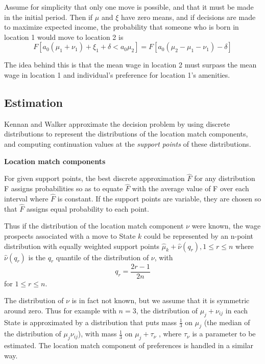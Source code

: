 \documentclass{article}
\numberwithin{equation}{section} %
\begin{document}
Assume for simplicity that only one move is possible, and that it must be made in the initial period. Then if $\mu$ and $\xi$ have  zero means, and if decisions are made to maximize expected income, the probability that someone who is born in location 1 would move to location 2 is
\begin{equation}
  F[a_0(\mu_1+\nu_1)+\xi_1+\delta<a_0\mu_2]=F[a_0(\mu_2-\mu_1-\nu_1)-\delta]
\end{equation}

The idea behind this is that the mean wage in location 2 must surpass the mean wage in location 1 and individual's preference for location 1's amenities.


\subsection{Estimation} %
\label{sub:estimation}

Kennan and Walker approximate the decision problem by using discrete distributions to represent the distributions of the location match components, and computing continuation values at the \textit{support points} of these distributions.

\textbf{Location match components}

For given support points, the best discrete approximation $\hat F$ for any distribution F assigns  probabilities so as to equate $\hat F$ with the average value of F over each interval where $\hat F$ is constant.  If the support points are variable, they are chosen so that $\hat F$ assigns equal probability to each  point. 

Thus if the distribution of the location match component $\nu$ were known, the wage  prospects associated with a move to State $k$ could be represented by an n-point distribution with  equally weighted support points $\hat\mu_k+\hat \nu(q_r), 1\leqslant r \leqslant n$ where $\hat \nu(q_r)$ is the $q_r$ quantile of the distribution of $\nu$, with
\begin{equation}
  q_r=\frac{2r-1}{2n}
\end{equation}
for $1\leqslant r \leqslant n$. 

The distribution of $\nu$ is in fact not known, but we assume that it is symmetric around zero. Thus for example with $n = 3$, the distribution of $\mu_j+\nu_{ij}$ in each State is  approximated by a distribution that puts mass $\frac{1}{3}$ on $\mu_j$ (the median of the distribution of $\mu_j\nu_{ij}$), with mass $\frac{1}{3}$ on $\mu_j+\tau_\nu$ , where $\tau_\nu$ is a parameter to be estimated. The location match  component of preferences is handled in a similar way.
\end{document}
